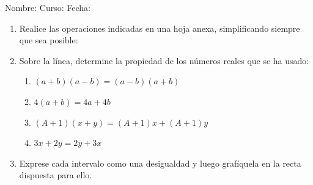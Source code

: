 \documentclass[fleqn]{article}
\newcommand{\LineaNombre}{%
\par
\vspace{\baselineskip}
Nombre:\hrulefill \; Curso: \underline{\hspace*{48pt}} \; Fecha: \underline{\hspace*{2.5cm}} \relax
\par}
\begin{document}
\LineaNombre
\begin{enumerate}
  \item Realice las operaciones indicadas en una hoja anexa, simplificando siempre que sea posible:
  \begin{enumerate}
  \end{enumerate}
   \item Sobre la línea, determine la propiedad de los números reales que se ha usado:
  \begin{enumerate}
    \item $ (a+b)(a-b)=(a-b)(a+b) $ \underline{\hspace{6cm}}
    \item $ 4(a+b)=4a+4b $ \underline{\hspace{6cm}}
    \item $ (A+1)(x+y)=(A+1)x+(A+1)y $ \underline{\hspace{6cm}}
    \item $ 3x+2y=2y+3x $ \underline{\hspace{6cm}}
  \end{enumerate}
  \item Exprese cada intervalo como una desigualdad y luego grafíquela en la recta dispuesta para ello.
  

\end{enumerate}
\end{document}

